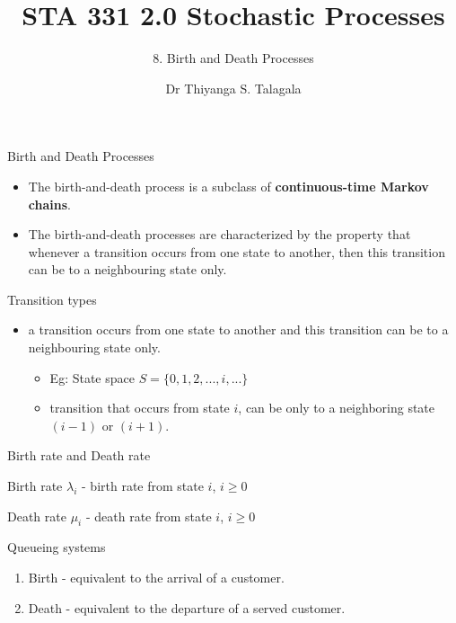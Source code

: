 \documentclass[12pt,ignorenonframetext,]{beamer}
\title[]{STA 331 2.0 Stochastic Processes}
\subtitle{8. Birth and Death Processes}
\author[
        Dr Thiyanga S. Talagala
    ]{Dr Thiyanga S. Talagala}
\institute[
    ]{
    Department of Statistics, University of Sri Jayewardenepura
    }
\date[
      
  ]{
    }
\begin{document}
  \begin{frame}[plain]
  \titlepage
  \end{frame}



\begin{frame}{Birth and Death Processes}
\protect\hypertarget{birth-and-death-processes}{}
\begin{itemize}
\item
  The birth-and-death process is a subclass of \textbf{continuous-time
  Markov chains}.
\item
  The birth-and-death processes are characterized by the property that
  whenever a transition occurs from one state to another, then this
  transition can be to a neighbouring state only.
\end{itemize}
\end{frame}

\begin{frame}{Transition types}
\protect\hypertarget{transition-types}{}
\begin{itemize}
\item
  a transition occurs from one state to another and this transition can
  be to a neighbouring state only.

  \begin{itemize}
  \item
    Eg: State space \(S = \{0, 1, 2, ..., i, ...\}\)
  \item
    transition that occurs from state \(i\), can be only to a
    neighboring state \((i-1)\) or \((i+1)\).
  \end{itemize}
\end{itemize}
\end{frame}

\begin{frame}{Birth rate and Death rate}
\protect\hypertarget{birth-rate-and-death-rate}{}
\begin{block}{Birth rate}
\protect\hypertarget{birth-rate}{}
\(\lambda_i\) - birth rate from state \(i\), \(i \geq 0\)
\end{block}

\begin{block}{Death rate}
\protect\hypertarget{death-rate}{}
\(\mu_i\) - death rate from state \(i\), \(i \geq 0\)
\end{block}
\end{frame}

\begin{frame}{Queueing systems}
\protect\hypertarget{queueing-systems}{}
\begin{enumerate}
\item
  Birth - equivalent to the arrival of a customer.
\item
  Death - equivalent to the departure of a served customer.
\end{enumerate}
\end{frame}
\end{document}
